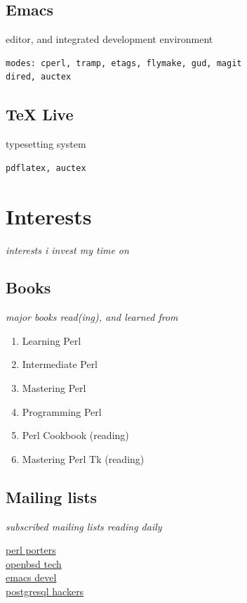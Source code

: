 \documentclass {article}
\begin{document}
    \subsection{Emacs}
    editor, and integrated development environment
      \begin{verbatim}
modes: cperl, tramp, etags, flymake, gud, magit
dired, auctex
   \end{verbatim}

    \subsection{TeX Live}
    typesetting system
      \begin{verbatim}
pdflatex, auctex
   \end{verbatim}

  \section{Interests}
  \textit{interests i invest my time on}

    \subsection{Books}
      \textit{major books read(ing), and learned from}
      \begin{enumerate}
        \item{Learning Perl\cite{learning_perl}}
        \item{Intermediate Perl\cite{intermediate_perl}}
        \item{Mastering Perl\cite{mastering_perl}}
        \item{Programming Perl\cite{programming_perl}}
        \item{Perl Cookbook\cite{perl_cookbook}} (reading)
        \item{Mastering Perl Tk\cite{perl_tk}} (reading)
      \end{enumerate}

    \subsection{Mailing lists}
      \textit{subscribed mailing lists reading daily}
      \begin{description}
        \item[\href{https://lists.perl.org/list/perl5-porters.html}{perl porters}]
        \item[\href{https://www.openbsd.org/mail.html}{openbsd tech}]
        \item[\href{https://lists.gnu.org/mailman/listinfo/emacs-devel}{emacs devel}]
        \item[\href{https://www.postgresql.org/list/pgsql-hackers/}{postgresql hackers}]
      \end{description}
\end{document}
